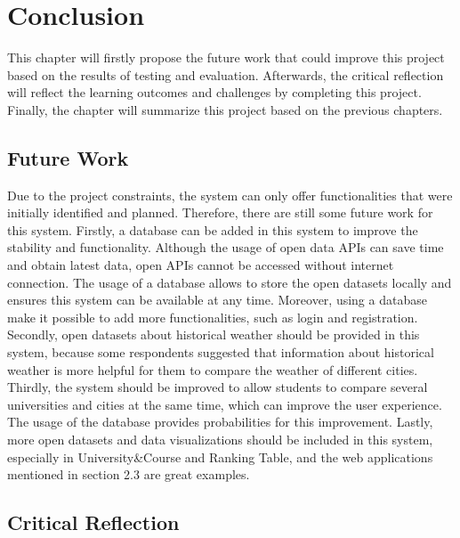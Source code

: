 \chapter{Conclusion} \label{Chapter: Conclusion}
This chapter will firstly propose the future work that could improve this project based on the results of testing and evaluation. Afterwards, the critical reflection will reflect the learning outcomes and challenges by completing this project. Finally, the chapter will summarize this project based on the previous chapters.


\section{Future Work}

Due to the project constraints, the system can only offer functionalities that were initially identified and planned. Therefore, there are still some future work for this system. Firstly, a database can be added in this system to improve the stability and functionality. Although the usage of open data APIs can save time and obtain latest data, open APIs cannot be accessed without internet connection. The usage of a database allows to store the open datasets locally and ensures this system can be available at any time. Moreover, using a database make it possible to add more functionalities, such as login and registration. Secondly, open datasets about historical weather should be provided in this system, because some respondents suggested that information about historical weather is more helpful for them to compare the weather of different cities. Thirdly, the system should be improved to allow students to compare several universities and cities at the same time, which can improve the user experience. The usage of the database provides probabilities for this improvement. Lastly, more open datasets and data visualizations should be included in this system, especially in University\&Course and Ranking Table, and the web applications mentioned in section 2.3 are great examples.

\section{Critical Reflection}

